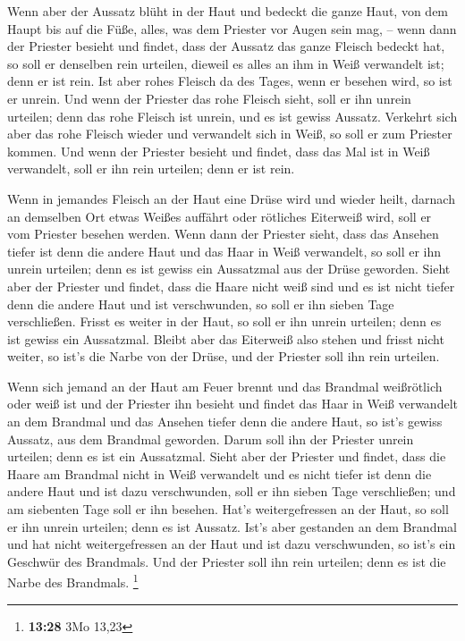  Wenn aber der Aussatz blüht in der Haut und bedeckt die
ganze Haut, von dem Haupt bis auf die Füße, alles, was dem Priester vor
Augen sein mag, --  wenn dann der Priester besieht und
findet, dass der Aussatz das ganze Fleisch bedeckt hat, so soll er
denselben rein urteilen, dieweil es alles an ihm in Weiß verwandelt ist;
denn er ist rein.  Ist aber rohes Fleisch da des Tages,
wenn er besehen wird, so ist er unrein.  Und wenn der
Priester das rohe Fleisch sieht, soll er ihn unrein urteilen; denn das
rohe Fleisch ist unrein, und es ist gewiss Aussatz. 
Verkehrt sich aber das rohe Fleisch wieder und verwandelt sich in Weiß,
so soll er zum Priester kommen.  Und wenn der Priester
besieht und findet, dass das Mal ist in Weiß verwandelt, soll er ihn
rein urteilen; denn er ist rein.

 Wenn in jemandes Fleisch an der Haut eine Drüse wird und
wieder heilt,  darnach an demselben Ort etwas Weißes
auffährt oder rötliches Eiterweiß wird, soll er vom Priester besehen
werden.  Wenn dann der Priester sieht, dass das Ansehen
tiefer ist denn die andere Haut und das Haar in Weiß verwandelt, so soll
er ihn unrein urteilen; denn es ist gewiss ein Aussatzmal aus der Drüse
geworden.  Sieht aber der Priester und findet, dass die
Haare nicht weiß sind und es ist nicht tiefer denn die andere Haut und
ist verschwunden, so soll er ihn sieben Tage verschließen. 
Frisst es weiter in der Haut, so soll er ihn unrein urteilen; denn es
ist gewiss ein Aussatzmal.  Bleibt aber das Eiterweiß also
stehen und frisst nicht weiter, so ist's die Narbe von der Drüse, und
der Priester soll ihn rein urteilen.

 Wenn sich jemand an der Haut am Feuer brennt und das
Brandmal weißrötlich oder weiß ist  und der Priester ihn
besieht und findet das Haar in Weiß verwandelt an dem Brandmal und das
Ansehen tiefer denn die andere Haut, so ist's gewiss Aussatz, aus dem
Brandmal geworden. Darum soll ihn der Priester unrein urteilen; denn es
ist ein Aussatzmal.  Sieht aber der Priester und findet,
dass die Haare am Brandmal nicht in Weiß verwandelt und es nicht tiefer
ist denn die andere Haut und ist dazu verschwunden, soll er ihn sieben
Tage verschließen;  und am siebenten Tage soll er ihn
besehen. Hat's weitergefressen an der Haut, so soll er ihn unrein
urteilen; denn es ist Aussatz.  Ist's aber gestanden an dem
Brandmal und hat nicht weitergefressen an der Haut und ist dazu
verschwunden, so ist's ein Geschwür des Brandmals. Und der Priester soll
ihn rein urteilen; denn es ist die Narbe des Brandmals. \footnote{\textbf{13:28}
  3Mo 13,23}


